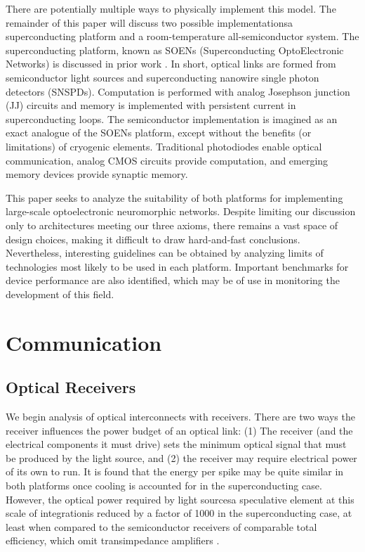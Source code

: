 \documentclass[twocolumn]{article}
\begin{document}
There are potentially multiple ways to physically implement this model. The remainder of this paper will discuss two possible implementations\textemdash a superconducting platform and a room-temperature all-semiconductor system. The superconducting platform, known as SOENs (Superconducting OptoElectronic Networks) is discussed in prior work \cite{shainline2017superconducting, shainline2019superconducting, shainline2019fluxonic, sh2021}. In short, optical links are formed from semiconductor light sources and superconducting nanowire single photon detectors (SNSPDs). Computation is performed with analog Josephson junction (JJ) circuits and memory is implemented with persistent current in superconducting loops. The semiconductor implementation is imagined as an exact analogue of the SOENs platform, except without the benefits (or limitations) of cryogenic elements. Traditional photodiodes enable optical communication, analog CMOS circuits provide computation, and emerging memory devices provide synaptic memory.

This paper seeks to analyze the suitability of both platforms for implementing large-scale optoelectronic neuromorphic networks. Despite limiting our discussion only to architectures meeting our three axioms, there remains a vast space of design choices, making it difficult to draw hard-and-fast conclusions. Nevertheless, interesting guidelines can be obtained by analyzing limits of technologies most likely to be used in each platform. Important benchmarks for device performance are also identified, which may be of use in monitoring the development of this field.

\section{\label{sec:communication}Communication}
\subsection{Optical Receivers}
We begin analysis of optical interconnects with receivers. There are two ways the receiver influences the power budget of an optical link: (1) The receiver (and the electrical components it must drive) sets the minimum optical signal that must be produced by the light source, and (2) the receiver may require electrical power of its own to run. It is found that the energy per spike may be quite similar in both platforms once cooling is accounted for in the superconducting case. However, the optical power required by light sources\textemdash a speculative element at this scale of integration\textemdash is reduced by a factor of 1000 in the superconducting case, at least when compared to the semiconductor receivers of comparable total efficiency, which omit transimpedance amplifiers \cite{miller2017attojoule}.
\end{document}
